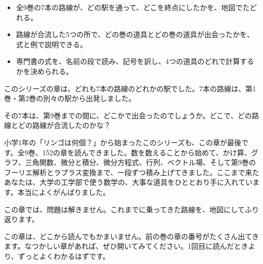 
\begin{goal}
\begin{itemize}[label={\color{\bkTT}●}, leftmargin=1.6\zw, itemsep=0pt, topsep=1pt]
\item {}\enspace 全9巻の7本の路線が、どの駅を通って、どこを終点にしたかを、地図でたどれる。
\item {}\enspace 路線が合流した5つの所で、どの巻の道具とどの巻の道具が出会ったかを、式と例で説明できる。
\item {}\enspace 専門書の式を、名前の段で読み、記号を訳し、4つの道具のどれで計算するかを決められる。
\end{itemize}
\end{goal}


\begin{hatena}
\noindent\begin{minipage}[c]{0.58\linewidth}
\raggedright
このシリーズの章は、どれも7本の路線のどれかの駅でした。7本の路線は、第1巻・第2巻の別々の駅から出発しました。\par\vspace{4pt}
その7本は、第9巻までの間に、どこかで出会ったのでしょうか。どこで、どの路線とどの路線が合流したのかな？
\end{minipage}\hfill
\begin{minipage}[c]{0.38\linewidth}
\centering
{}
\end{minipage}
\end{hatena}

小学1年の「リンゴは何個？」から始まったこのシリーズも、この章が最後です。全9巻、152の章を読んできました。数を数えることから始めて、かけ算、グラフ、三角関数、微分と積分、微分方程式、行列、ベクトル場、そして第9巻のフーリエ解析とラプラス変換まで、一段ずつ積み上げてきました。ここまで来たあなたは、大学の工学部で使う数学の、大事な道具をひととおり手に入れています。本当によくがんばりました。

この章では、問題は解きません。これまでに乗ってきた路線を、地図にしてふり返ります。

この章は、どこから読んでもかまいません。前の巻の章の番号がたくさん出てきます。なつかしい章があれば、ぜひ開いてみてください。1回目に読んだときより、ずっとよくわかるはずです。

\begin{omoidasou}
\end{omoidasou}

